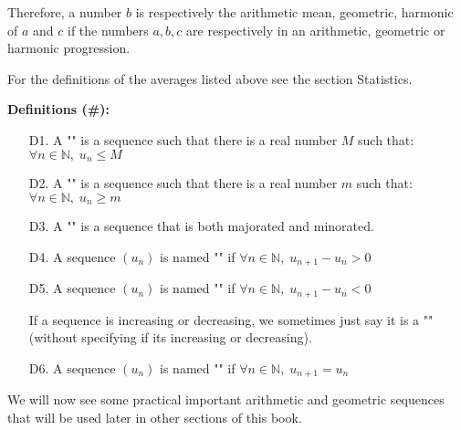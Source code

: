 	Therefore, a number $b$ is respectively the arithmetic mean, geometric, harmonic of $a$ and $c$ if the numbers $a, b, c$ are respectively in  an arithmetic, geometric or harmonic progression.

	\begin{tcolorbox}[title=Remark,colframe=black,arc=10pt]
For the definitions of the averages listed above see the section Statistics.
	\end{tcolorbox}
	
\textbf{Definitions (\#\mydef):}
	\begin{enumerate}
		\item[D1.] A "" is a sequence such that there is a real number $M$ such that:\\ $\forall n \in \mathbb{N}, \; u_n \leq M$
		
		\item[D2.] A "" is a sequence such that there is a real number $m$ such that:\\ $\forall n \in \mathbb{N}, \; u_n \geq m$
		
		\item[D3.] A "" is a sequence that is both majorated and minorated.
		
		\item[D4.] A sequence $(u_n)$ is named  "" if $\forall n \in \mathbb{N}, \; u_{n+1}-u_n > 0$
		
		\item[D5.]  A sequence $(u_n)$ is named  "" if $\forall n \in \mathbb{N}, \; u_{n+1}-u_n < 0$
		\begin{tcolorbox}[title=Remark,colframe=black,arc=10pt]
	If a sequence is increasing or decreasing, we sometimes just say it is a "" (without specifying if its increasing or decreasing).
		\end{tcolorbox}
		
		\item[D6.]  A sequence $(u_n)$ is named  "" if $\forall n \in \mathbb{N}, \; u_{n+1}=u_n$
	\end{enumerate}
	
	We will now see some practical important arithmetic and geometric sequences that will be used later in other sections of this book.
	
